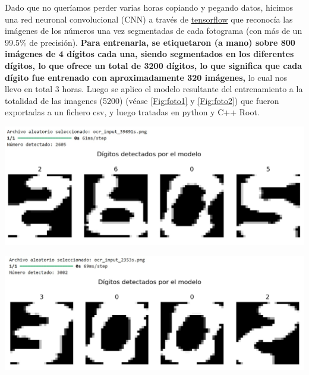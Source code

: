 \documentclass[11pt]{article}
\begin{document}
\vspace{1em}

 Dado que no queríamos perder varias horas copiando y pegando datos, hicimos una red neuronal convolucional (CNN) a través de \href{https://www.tensorflow.org/}{tensorflow} \cite{tensorflow2015-whitepaper} que reconocía las imágenes de los números una vez segmentadas de cada fotograma (con más de un 99.5\% de precisión). {\textbf{Para entrenarla, se etiquetaron (a mano) sobre 800 imágenes de 4 dígitos cada una, siendo segmentados en los diferentes dígitos, lo que ofrece un total de 3200 dígitos, lo que significa que cada dígito fue entrenado con aproximadamente 320 imágenes,} lo cual nos llevo en total 3 horas.} Luego se aplico el modelo resultante del entrenamiento a la totalidad de las imagenes (5200) (véase \cref{Fig:foto1} y \ref{Fig:foto2}) que fueron exportadas a un fichero csv, y luego tratadas en python y C++ Root.
\begin{minipage}[t]{0.45\linewidth}
	\begin{center}
	\label{Fig:foto1}
	\includegraphics[width=0.9\linewidth]{../Imagenes/Foto1.jpeg}
	\end{center}
\end{minipage}	
\hfill
\begin{minipage}[t]{0.45\linewidth}
\begin{center}
	\label{Fig:foto2}
	\includegraphics[width=0.9\linewidth]{../Imagenes/Foto2.jpeg}
\end{center}
\end{minipage}	
\end{document}
